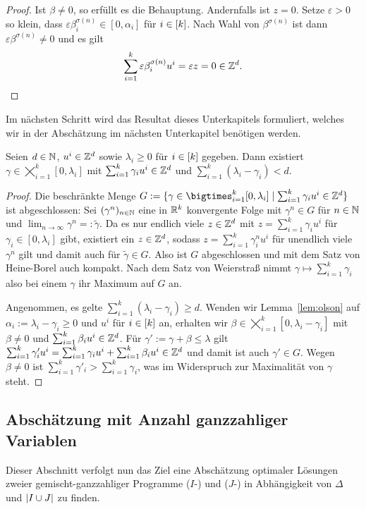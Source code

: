 \begin{proof}
	Ist $\beta\neq0$, so erfüllt es die Behauptung.
	Andernfalls ist $z=0$.
	Setze $\varepsilon>0$ so klein, dass $\varepsilon\beta^{\sigma(n)}_i\in[0,\alpha_i]$ für $i\in[k]$.
	Nach Wahl von $\beta^{\sigma(n)}$ ist dann $\varepsilon\beta^{\sigma(n)}\neq0$ und es gilt $$\sum_{i=1}^k\varepsilon\beta^{\sigma(n)}_iu^i=\varepsilon z=0\in\mathbb{Z}^d.$$
\end{proof}

Im nächsten Schritt wird das Resultat dieses Unterkapitels formuliert, welches wir in der Abschätzung im nächsten Unterkapitel benötigen werden.

\begin{lemma}\label{lem:maxgamma}
	Seien $d\in\mathbb{N}$, $u^i\in\mathbb{Z}^d$ sowie $\lambda_i\geq0$ für $i\in[k]$ gegeben.
	Dann existiert $\gamma\in\bigtimes_{i=1}^k [0,\lambda_i]$ mit $\sum_{i=1}^k \gamma_i u^i\in\mathbb{Z}^d$ und  $\sum_{i=1}^k(\lambda_i-\gamma_i)<d$.
\end{lemma}
\begin{proof}
	Die beschränkte Menge $G:=\{\gamma \in \bigtimes_{i=1}^k [0,\lambda_i] \mid \sum_{i=1}^k \gamma_i u^i\in\Z^d \}$ ist abgeschlossen: Sei $(\gamma^n)_{n\in\mathbb{N}}$ eine in $\mathbb{R}^k$ konvergente Folge mit $\gamma^n\in G$ für $n\in\mathbb{N}$ und $\lim_{n\to\infty}\gamma^n=:\tilde{\gamma}$.
	Da es nur endlich viele $z\in\mathbb{Z}^d$ mit $z=\sum_{i=1}^k\gamma_iu^i$ für $\gamma_i\in[0,\lambda_i]$ gibt, existiert ein $z\in\mathbb{Z}^d$, sodass $z=\sum_{i=1}^k\gamma^n_iu^i$ für unendlich viele $\gamma^n$ gilt und damit auch für $\tilde{\gamma}\in G$.
	Also ist $G$ abgeschlossen und mit dem Satz von Heine-Borel auch kompakt.
	Nach dem Satz von Weierstraß nimmt $\gamma \mapsto \sum_{i=1}^k\gamma_i$ also bei einem $\gamma$ ihr Maximum auf $G$ an.
	
	Angenommen, es gelte $\sum_{i=1}^k(\lambda_i - \gamma_i) \geq d$.
	Wenden wir Lemma~\ref{lem:olson} auf $\alpha_i:=\lambda_i-\gamma_i\geq0$ und $u^i$ für $i\in[k]$ an, erhalten wir $\beta\in\bigtimes_{i=1}^k[0,\lambda_i-\gamma_i]$ mit $\beta\neq0$ und $\sum_{i=1}^k \beta_i u^i\in\mathbb{Z}^d$.
	Für $\gamma':=\gamma+\beta\leq\lambda$ gilt 
	$
	\sum_{i=1}^k\gamma'_iu^i = \sum_{i=1}^k\gamma_iu^i + \sum_{i=1}^k \beta_iu^i\in\mathbb{Z}^d
	$
	und damit ist auch $\gamma'\in G$.
	Wegen $\beta\neq0$ ist $\sum_{i=1}^k\gamma'_i > \sum_{i=1}^k\gamma_i$, was im Widerspruch zur Maximalität von $\gamma$ steht.
\end{proof}

\subsection{Abschätzung mit Anzahl ganzzahliger Variablen}
Dieser Abschnitt verfolgt nun das Ziel eine Abschätzung optimaler Lösungen zweier gemischt-ganzzahliger Programme	($I$-\MIPR) und ($J$-\MIPR) in Abhängigkeit von $\Delta$ und $\lvert I\cup J \rvert$ zu finden.

